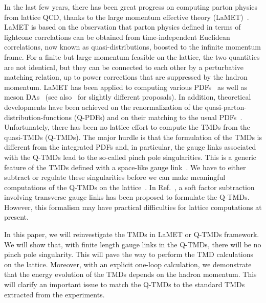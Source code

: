 \documentclass[aps,prd,preprint,tightenlines,superscriptaddress,nofootinbib]{revtex4}
\begin{document}
In the last few years, there has been great progress on computing parton physics from lattice QCD, 
thanks to the large momentum effective theory (LaMET)~\cite{Ji:2013dva}. LaMET is based on 
the observation that parton physics defined in terms of lightcone correlations can be obtained from 
time-independent Euclidean correlations, now known as quasi-distributions, boosted to the infinite 
momentum frame. For a finite but large momentum feasible on the lattice, the two quantities are not 
identical, but they can be connected to each other by a perturbative matching relation, up to power 
corrections that are suppressed by the hadron momentum. LaMET has been applied to computing various 
PDFs~\cite{Lin:2014zya,Alexandrou:2015rja,Chen:2016utp,Alexandrou:2016jqi,Chen:2017mzz,
Lin:2017ani,Alexandrou:2017dzj} as well as meson DAs~\cite{Zhang:2017bzy,Chen:2017gck} 
(see also~\cite{Ma:2014jla,Ma:2017pxb} for slightly different proposals). In addition, 
theoretical developments have been achieved on the renormalization of 
the quasi-parton-distribution-functions (Q-PDFs) and on their matching to the usual PDFs~\cite{Xiong:2013bka,Xiong:2017jtn,Wang:2017qyg,Wang:2017eel,Stewart:2017tvs,Ji:2015qla,
Xiong:2015nua,Ji:2015jwa,Ishikawa:2016znu,Chen:2016fxx,
Constantinou:2017sej,Alexandrou:2017huk,Chen:2017mzz,Ji:2017oey,Ji:2017rah,
Ishikawa:2017faj,Green:2017xeu,Li:2016amo,Monahan:2016bvm,Briceno:2017cpo,Monahan:2017hpu,Zhang:2018ggy,Izubuchi:2018srq}. 
Unfortunately, there has been no lattice effort to compute the TMDs from the quasi-TMDs (Q-TMDs). The major
hurdle is that the formulation of the TMDs is different from the integrated 
PDFs and, in particular, the gauge links associated with the Q-TMDs lead
to the so-called pinch pole singularities. This is a generic feature of the
TMDs defined with a space-like gauge link~\cite{bbdm,Collins:1981uk}.
We have to either subtract or regulate
these singularities before we can make meaningful computations of 
the Q-TMDs on the lattice~\cite{Collins}.
In Ref.~\cite{Ji:2014hxa}, a soft factor subtraction involving transverse
gauge links has been proposed to formulate the Q-TMDs. However,
this formalism may have practical difficulties for lattice computations at present. 

In this paper, we will reinvestigate the TMDs in LaMET or Q-TMDs framework. 
We will show that, with finite length gauge links in the Q-TMDs, there will be no 
pinch pole singularity. This will pave
the way to perform the TMD calculations on the lattice. Moreover,
with an explicit one-loop calculation, we demonstrate that the
energy evolution of the TMDs depends on the hadron momentum.
This will clarify an important issue to match the Q-TMDs
to the standard TMDs extracted from the experiments. 
\end{document}
